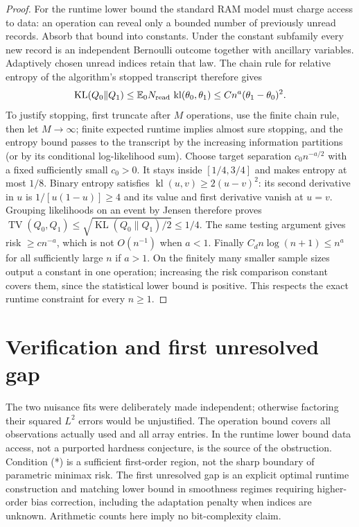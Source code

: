 \documentclass[11pt]{article}
\theoremstyle{remark}
\newcommand{\E}{\mathbb E}
\newcommand{\TV}{\operatorname{TV}}
\newcommand{\KL}{\operatorname{KL}}
\begin{document}
\begin{proof}
For the runtime lower bound the standard RAM model must charge access
to data: an operation can reveal only a bounded number of previously
unread records. Absorb that bound into constants. Under the constant
subfamily every new record is an independent Bernoulli outcome together
with ancillary variables. Adaptively chosen unread indices retain that
law. The chain rule for relative entropy of the algorithm's stopped
transcript therefore gives
\[
 \KL(Q_0\|Q_1)\leq
 \E_0 N_{\rm read}\,
 \operatorname{kl}(\theta_0,\theta_1)
 \leq C n^a(\theta_1-\theta_0)^2.
\]
To justify stopping, first truncate after $M$ operations, use the finite
chain rule, then let $M\to\infty$; finite expected runtime implies almost
sure stopping, and the entropy bound passes to the transcript by the
increasing information partitions (or by its conditional log-likelihood
sum). Choose target separation $c_0 n^{-a/2}$ with a fixed sufficiently
small $c_0>0$. It stays inside $[1/4,3/4]$ and makes entropy at most
$1/8$. Binary entropy satisfies
$\operatorname{kl}(u,v)\geq2(u-v)^2$: its second derivative in $u$ is
$1/[u(1-u)]\geq4$ and its value and first derivative vanish at $u=v$.
Grouping likelihoods on an event by Jensen therefore proves
$\TV(Q_0,Q_1)\leq\sqrt{\KL(Q_0\|Q_1)/2}\leq1/4$.
The same testing argument gives risk $\geq c n^{-a}$, which is not
$O(n^{-1})$ when $a<1$.
Finally $C_dn\log(n+1)\leq n^a$ for all sufficiently large $n$ if
$a>1$. On the finitely many smaller sample sizes output a constant in
one operation; increasing the risk comparison constant covers them,
since the statistical lower bound is positive. This respects the exact
runtime constraint for every $n\geq1$.
\end{proof}

\section{Verification and first unresolved gap}
The two nuisance fits were deliberately made independent; otherwise
factoring their squared $L^2$ errors would be unjustified. The operation
bound covers all observations actually used and all array entries. In
the runtime lower bound data access, not a purported hardness conjecture,
is the source of the obstruction. Condition (*) is a sufficient
first-order region, not the sharp boundary of parametric minimax risk.
The first unresolved gap is an explicit optimal runtime construction
and matching lower bound in smoothness regimes requiring higher-order
bias correction, including the adaptation penalty when indices are
unknown. Arithmetic counts here imply no bit-complexity claim.
\end{document}
